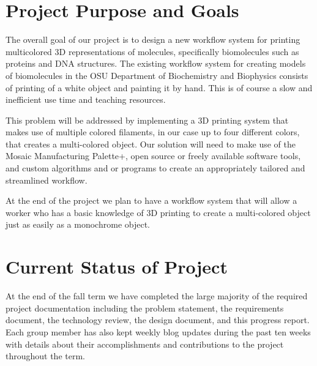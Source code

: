 \documentclass[letterpaper, onecolumn, draftclsnofoot, 10pt, compsoc]{IEEEtran}
\begin{document}
\newpage
\tableofcontents
\clearpage

\begin{singlespace}
\section{Project Purpose and Goals}
The overall goal of our project is to design a new workflow system for printing multicolored 3D representations of molecules, specifically biomolecules such as proteins and DNA structures. The existing workflow system for creating models of biomolecules in the OSU Department of Biochemistry and Biophysics consists of printing of a white object and painting it by hand. This is of course a slow and inefficient use time and teaching resources.\par 
This problem will be addressed by implementing a 3D printing system that makes use of multiple colored filaments, in our case up to four different colors, that creates a multi-colored object. Our solution will need to make use of the Mosaic Manufacturing Palette+, open source or freely available software tools, and custom algorithms and or programs to create an appropriately tailored and streamlined workflow.\par
At the end of the project we plan to have a workflow system that will allow a worker who has a basic knowledge of 3D printing to create a multi-colored object just as easily as a monochrome object.\par

\section{Current Status of Project}
At the end of the fall term we have completed the large majority of the required project documentation including the problem statement, the requirements document, the technology review, the design document, and this progress report. Each group member has also kept weekly blog updates during the past ten weeks with details about their accomplishments and contributions to the project throughout the term.\par


\end{singlespace}
\end{document}
